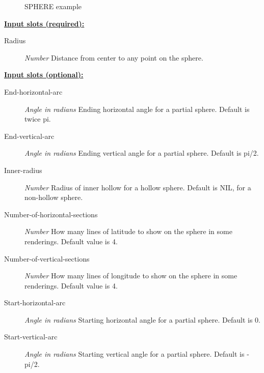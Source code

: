 \documentclass [11pt]{book}
\begin{document}
\begin{itemize}
\begin{figure}
\caption{SPHERE example}

\label{fig:SPHERE}

\end{figure}





\textbf{
\underline{Input slots (required):}}

\begin{description}

\item [Radius]
\emph{Number} Distance from center to any point on the sphere.


\end{description}






\textbf{
\underline{Input slots (optional):}}

\begin{description}

\item [End-horizontal-arc]
\emph{Angle in radians} Ending horizontal angle for a partial sphere. Default is twice pi.


\item [End-vertical-arc]
\emph{Angle in radians} Ending vertical angle for a partial sphere. Default is pi/2.


\item [Inner-radius]
\emph{Number} Radius of inner hollow for a hollow sphere. Default is NIL, for a non-hollow sphere.


\item [Number-of-horizontal-sections]
\emph{Number} How many lines of latitude to show on the sphere in some renderings. Default value is 4.


\item [Number-of-vertical-sections]
\emph{Number} How many lines of longitude to show on the sphere in some renderings. Default value is 4.


\item [Start-horizontal-arc]
\emph{Angle in radians} Starting horizontal angle for a partial sphere. Default is 0.


\item [Start-vertical-arc]
\emph{Angle in radians} Starting vertical angle for a partial sphere. Default is -pi/2.



\end{description}
\end{itemize}
\end{document}
